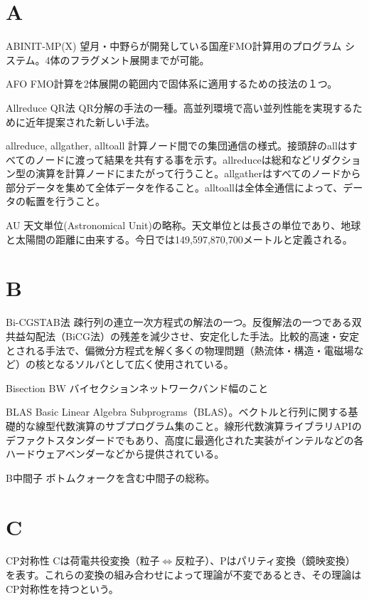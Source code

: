 %
%
\begin{用語集}
\section{A}
\item{ABINIT-MP(X)}{}
{望月・中野らが開発している国産FMO計算用のプログラム
システム。4体のフラグメント展開までが可能。}
\item{AFO}{}
{FMO計算を2体展開の範囲内で固体系に適用するための技法の１つ。}
\item{Allreduce QR法}{}
{QR分解の手法の一種。高並列環境で高い並列性能を実現するために近年提案された新しい手法。}
\item{allreduce, allgather, alltoall}{}
{計算ノード間での集団通信の様式。接頭辞のallはすべてのノードに渡って結果を共有する事を示す。allreduceは総和などリダクション型の演算を計算ノードにまたがって行うこと。allgatherはすべてのノードから部分データを集めて全体データを作ること。alltoallは全体全通信によって、データの転置を行うこと。}
\item{AU}{}
{天文単位(Astronomical Unit)の略称。天文単位とは長さの単位であり、地球と太陽間の距離に由来する。今日では149,597,870,700メートルと定義される。}
\section{B}
\item{Bi-CGSTAB法}{}
{疎行列の連立一次方程式の解法の一つ。反復解法の一つである双共益勾配法（BiCG法）の残差を減少させ、安定化した手法。比較的高速・安定とされる手法で、偏微分方程式を解く多くの物理問題（熱流体・構造・電磁場など）の核となるソルバとして広く使用されている。}
\item{Bisection BW}{}
{バイセクションネットワークバンド幅のこと}
\item{BLAS}{}
{Basic Linear Algebra Subprograms（BLAS）。ベクトルと行列に関する基礎的な線型代数演算のサブプログラム集のこと。線形代数演算ライブラリAPIのデファクトスタンダードでもあり、高度に最適化された実装がインテルなどの各ハードウェアベンダーなどから提供されている。}
\item{B中間子}{}
{ボトムクォークを含む中間子の総称。}
\section{C}
\item{CP対称性}{}
{Cは荷電共役変換（粒子$\Leftrightarrow$反粒子）、Pはパリティ変換（鏡映変換）を表す。これらの変換の組み合わせによって理論が不変であるとき、その理論はCP対称性を持つという。}

\end{用語集}
